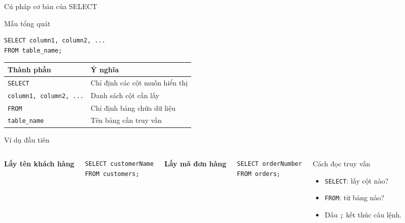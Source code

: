 \documentclass[aspectratio=169,11pt]{beamer}
\newcommand{\kw}[1]{\textcolor{sqlblue}{\texttt{#1}}}
\newcommand{\minihead}[1]{\vspace{2pt}\textbf{#1}\vspace{2pt}}
\begin{document}
\begin{frame}[fragile]{Cú pháp cơ bản của SELECT}
\begin{block}{Mẫu tổng quát}
\begin{lstlisting}
SELECT column1, column2, ...
FROM table_name;
\end{lstlisting}
\end{block}
\begin{center}
\begin{tabular}{ll}
\toprule
\textbf{Thành phần} & \textbf{Ý nghĩa} \\
\midrule
\kw{SELECT} & Chỉ định các cột muốn hiển thị \\
\texttt{column1, column2, ...} & Danh sách cột cần lấy \\
\kw{FROM} & Chỉ định bảng chứa dữ liệu \\
\texttt{table\_name} & Tên bảng cần truy vấn \\
\bottomrule
\end{tabular}
\end{center}
\end{frame}

\begin{frame}[fragile]{Ví dụ đầu tiên}
\begin{columns}[T]
\minihead{Lấy tên khách hàng}
\begin{lstlisting}
SELECT customerName
FROM customers;
\end{lstlisting}
\minihead{Lấy mã đơn hàng}
\begin{lstlisting}
SELECT orderNumber
FROM orders;
\end{lstlisting}
\begin{block}{Cách đọc truy vấn}
\begin{itemize}
  \item \kw{SELECT}: lấy cột nào?
  \item \kw{FROM}: từ bảng nào?
  \item Dấu \texttt{;} kết thúc câu lệnh.
\end{itemize}
\end{block}
\end{columns}
\end{frame}
\end{document}
